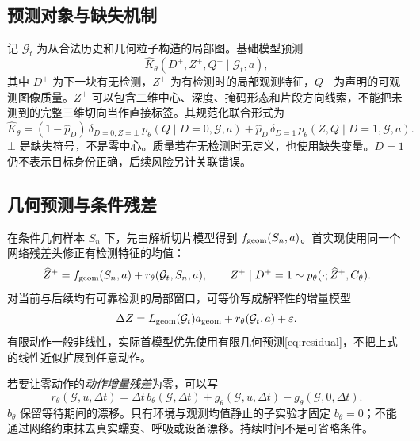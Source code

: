 \documentclass[UTF8,fontset=fandol,11pt,a4paper]{ctexart}
\theoremstyle{plain}
\theoremstyle{definition}
\theoremstyle{remark}
\numberwithin{equation}{section}
\newcommand{\G}{\mathcal G}
\begin{document}
\subsection{预测对象与缺失机制}
记 $\G_t$ 为从合法历史和几何粒子构造的局部图。基础模型预测
\begin{equation}
\widehat K_\theta(D^+,Z^+,Q^+\mid\G_t,a),
\label{eq:kernel}
\end{equation}
其中 $D^+$ 为下一块有无检测，$Z^+$ 为有检测时的局部观测特征，$Q^+$ 为声明的可观测图像质量。$Z^+$ 可以包含二维中心、深度、掩码形态和片段方向线索，不能把未测到的完整三维切向当作直接标签。其规范化联合形式为
\begin{equation}
\widehat K_\theta=
(1-\widehat p_D)\,\delta_{D=0,Z=\bot}\,p_\theta(Q\mid D=0,\G,a)
+\widehat p_D\,\delta_{D=1}\,p_\theta(Z,Q\mid D=1,\G,a).
\label{eq:missing}
\end{equation}
$\bot$ 是缺失符号，不是零中心。质量若在无检测时无定义，也使用缺失变量。$D=1$ 仍不表示目标身份正确，后续风险另计关联错误。

\subsection{几何预测与条件残差}
在条件几何样本 $S_n$ 下，先由解析切片模型得到 $f_{\rm geom}(S_n,a)$。首实现使用同一个网络残差头修正有检测特征的均值：
\begin{equation}
\widehat Z^+=f_{\rm geom}(S_n,a)+r_\theta(\G_t,S_n,a),
\qquad Z^+\mid D^+=1\sim p_\theta(\cdot;\widehat Z^+,C_\theta).
\label{eq:residual}
\end{equation}
对当前与后续均有可靠检测的局部窗口，可等价写成解释性的增量模型
\begin{equation}
\Delta Z=L_{\rm geom}(\G_t)a_{\rm geom}+r_\theta(\G_t,a)+\varepsilon.
\end{equation}
有限动作一般非线性，实际首模型优先使用有限几何预测\eqref{eq:residual}，不把上式的线性近似扩展到任意动作。

若要让零动作的\emph{动作增量残差}为零，可以写
\begin{equation}
r_\theta(\G,u,\Delta t)=\Delta t\,b_\theta(\G,\Delta t)
+g_\theta(\G,u,\Delta t)-g_\theta(\G,0,\Delta t).
\label{eq:zero}
\end{equation}
$b_\theta$ 保留等待期间的漂移。只有环境与观测均值静止的子实验才固定 $b_\theta=0$；不能通过网络约束抹去真实蠕变、呼吸或设备漂移。持续时间不是可省略条件。
\end{document}
